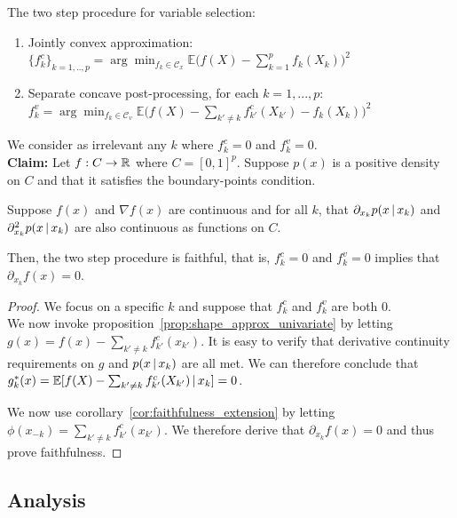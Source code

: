 \documentclass{article}
\begin{document}
The two step procedure for variable selection:

\begin{enumerate}
\item Jointly convex approximation:\\ $\{f^c_k\}_{k=1,..,p} = \arg\min_{f_k \in \mathcal{C}_x} \mathbb{E}\Big( f(X) - \sum_{k=1}^p f_k(X_k) \Big)^2$
\item Separate concave post-processing, for each $k=1,...,p$: \\
$f^v_k = \arg\min_{f_k \in \mathcal{C}_v} 
    \mathbb{E}\Big( f(X) - \sum_{k' \neq k} f^c_{k'}(X_{k'}) - f_k(X_k) \Big)^2$
\end{enumerate}

We consider as irrelevant any $k$ where $f^c_k = 0$ and $f^v_k = 0$.\\

\textbf{Claim:} Let $f : C \rightarrow \mathbb{R}$ where $C = [0,1]^p$. Suppose $p(x)$ is a positive density on $C$ and that it satisfies the boundary-points condition.

Suppose $f(x)$ and $\nabla f(x)$ are continuous and for all $k$, that $\partial_{x_k} p(x \,|\, x_k)$ and $\partial^2_{x_k} p(x \,|\, x_k)$ are also continuous as functions on $C$.


Then, the two step procedure is faithful, that is, $f^c_k = 0$ and $f^v_k =0$ implies that $\partial_{x_k} f(x) = 0$.\\

\begin{proof}
We focus on a specific $k$ and suppose that $f^c_k$ and $f^v_k$ are both $0$.\\

We now invoke proposition~\ref{prop:shape_approx_univariate} by letting $g(x) = f(x) - \sum_{k'\neq k} f^c_{k'}(x_{k'})$. It is easy to verify that derivative continuity requirements on $g$ and $p(x \,|\, x_k)$ are all met. We can therefore conclude that $g^*_k(x) = \mathbb{E}[ f(X) - \sum_{k'\neq k} f^c_{k'}(X_{k'}) \,|\, x_k] = 0$.

We now use corollary~\ref{cor:faithfulness_extension} by letting $\phi(x_{-k}) = \sum_{k'\neq k} f^c_{k'}(x_{k'})$. We therefore derive that $\partial_{x_k} f(x) = 0$ and thus prove faithfulness.

\end{proof}

\subsection{Analysis}
\end{document}
